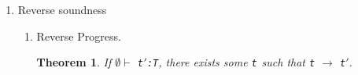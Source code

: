\documentclass{article}
\newcommand{\term}[1]{{\tt t$_{#1}$}}
\newcommand{\mathType}[2]{\mathtt{#1}:\mathtt{#2}}
\newtheorem{theorem}{Theorem}
\begin{document}
\begin{enumerate}
\begin{enumerate}
           \begin{equation*}
             \Gamma = \{ \mathType{x}{Int}, \mathType{f}{Int \rightarrow Bool} \}
           \end{equation*}
           \begin{equation*}
             \trfrac[T-App]{
               \trfrac[T-Var]{
                 \mathtt{f : Int} \rightarrow \mathtt{Bool} \in \Gamma
               }{
                 \Gamma \vdash \mathtt{f : Int} \rightarrow \mathtt{Bool}
               }
               \ \
               \trfrac[T-If]{
                 \Gamma \vdash
                 \ \
                 \trfrac[T-App]{
                   \trfrac[T-Var]{
                     \mathtt{f : Int} \rightarrow \mathtt{Bool} \in \Gamma
                   }{
                     \Gamma \vdash \mathtt{f : Int} \rightarrow \mathtt{Bool}
                   }
                   \ \
                   \trfrac[T-Var]{
                     \mathType{x}{Int} \in \Gamma
                   }{
                     \Gamma \vdash \mathType{x}{Int}
                   }
                 }{
                   \mathType{f\ x}{Bool}
                 }
                 \ \
                 \trfrac[T-Num]{}{
                   \mathType{0}{Int}
                 }
                 \ \
                 \trfrac[T-Num]{}{
                   \mathType{1}{Int}
                 }
               }{
                 \Gamma \vdash \mathtt{(if\ (f\ x)\ then\ 0\ else\ 1) : Int}
               }
             }{
               \Gamma \vdash \mathtt{f\ (if\ (f\ x)\ then\ 0\ else\ 1) : Bool}
             }
           \end{equation*}

         \item \verb|f (if (f x) then (f 0) else 1)| \\

           Won't check because the type of \verb|f| would have to be \verb|Int| $\longrightarrow$ \verb|Bool| for the \term{1} of the \verb|if| and \verb|Int| $\longrightarrow$ \verb|Int| for the \term{2} simultaneously.
       \end{enumerate}

     \item Reverse soundness
       \begin{enumerate}
         \item Reverse Progress.

           \begin{theorem}
             If $\emptyset \vdash$ \term{}$'$\verb|:T|, there exists some \term{} such that \verb|t| $\longrightarrow$ \verb|t|$'$.
           \end{theorem}


\end{enumerate}
\end{enumerate}
\end{document}
